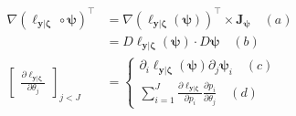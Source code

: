 \documentclass[long, final]{jobim}
\begin{document}
\begin{equation}
\label{eq:chain-rule-first-order}
\begin{aligned}
  \nabla \left(\ell_{\boldsymbol{y} | \boldsymbol{\zeta}} \, \circ \boldsymbol{\psi}\right)^\top &= 
    \nabla \left(\ell_{\boldsymbol{y} | \boldsymbol{\zeta}} (\boldsymbol{\psi}) \right)^\top \times \mathbf{J}_{\boldsymbol{\psi}}  \quad (a)\\
    &=   D \ell_{\boldsymbol{y} | \boldsymbol{\zeta}} (\boldsymbol{\psi}) \cdot D \boldsymbol{\psi} \quad (b) \\  
\begin{bmatrix}
\frac{\partial \ell_{\boldsymbol{y} | \boldsymbol{\zeta}}}{\partial \theta_j}
\end{bmatrix}_{j < J}
  &=  
\begin{cases}
\partial_i \ell_{\boldsymbol{y} | \boldsymbol{\zeta}} (\boldsymbol{\psi}) \partial_j \boldsymbol{\psi}_i \quad (c) \\
\sum_{i=1}^J \frac{\partial \ell_{\boldsymbol{y} | \boldsymbol{\zeta}}}{\partial p_i} \frac{\partial p_i}{\partial \theta_j} \quad (d)
\end{cases}
 \end{aligned}
\end{equation}
\end{document}
